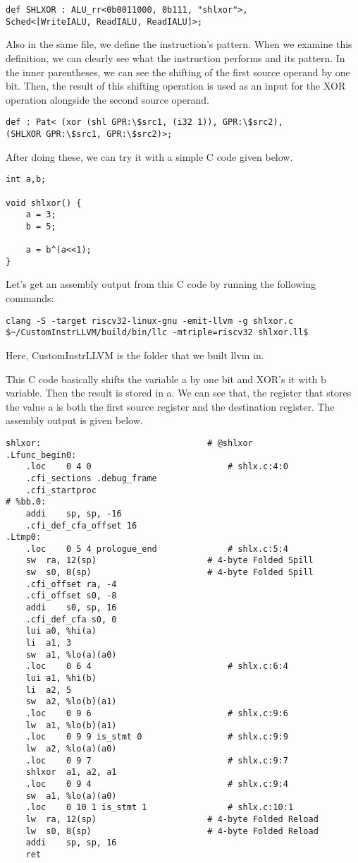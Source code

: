 \begin{lstlisting}
def SHLXOR : ALU_rr<0b0011000, 0b111, "shlxor">,
Sched<[WriteIALU, ReadIALU, ReadIALU]>;
\end{lstlisting}

Also in the same file, we define the instruction’s pattern. When we examine this definition, we can clearly see what the instruction performs and its pattern. In the inner parentheses, we can see the shifting of the first source operand by one bit. Then, the result of this shifting operation is used as an input for the XOR operation alongside the second source operand.

\begin{lstlisting}
def : Pat< (xor (shl GPR:\$src1, (i32 1)), GPR:\$src2),
(SHLXOR GPR:\$src1, GPR:\$src2)>;
\end{lstlisting}

After doing these, we can try it with a simple C code given below. 

\begin{lstlisting}
int a,b;

void shlxor() {
	a = 3;
	b = 5;
		
	a = b^(a<<1);
}
\end{lstlisting}

Let’s get an assembly output from this C code by running the following commands:

\begin{lstlisting}
clang -S -target riscv32-linux-gnu -emit-llvm -g shlxor.c
$~/CustomInstrLLVM/build/bin/llc -mtriple=riscv32 shlxor.ll$
\end{lstlisting}

Here, CustomInstrLLVM is the folder that we built llvm in.

This C code basically shifts the variable a by one bit and XOR’s it with b variable. Then the result is stored in a. We can see that, the register that stores the value a is both the first source register and the destination register. The assembly output is given below.

\begin{lstlisting}
shlxor:                                 # @shlxor
.Lfunc_begin0:
	.loc	0 4 0                           # shlx.c:4:0
	.cfi_sections .debug_frame
	.cfi_startproc
# %bb.0:
	addi	sp, sp, -16
	.cfi_def_cfa_offset 16
.Ltmp0:
	.loc	0 5 4 prologue_end              # shlx.c:5:4
	sw	ra, 12(sp)                      # 4-byte Folded Spill
	sw	s0, 8(sp)                       # 4-byte Folded Spill
	.cfi_offset ra, -4
	.cfi_offset s0, -8
	addi	s0, sp, 16
	.cfi_def_cfa s0, 0
	lui	a0, %hi(a)
	li	a1, 3
	sw	a1, %lo(a)(a0)
	.loc	0 6 4                           # shlx.c:6:4
	lui	a1, %hi(b)
	li	a2, 5
	sw	a2, %lo(b)(a1)
	.loc	0 9 6                           # shlx.c:9:6
	lw	a1, %lo(b)(a1)
	.loc	0 9 9 is_stmt 0                 # shlx.c:9:9
	lw	a2, %lo(a)(a0)
	.loc	0 9 7                           # shlx.c:9:7
	shlxor	a1, a2, a1
	.loc	0 9 4                           # shlx.c:9:4
	sw	a1, %lo(a)(a0)
	.loc	0 10 1 is_stmt 1                # shlx.c:10:1
	lw	ra, 12(sp)                      # 4-byte Folded Reload
	lw	s0, 8(sp)                       # 4-byte Folded Reload
	addi	sp, sp, 16
	ret
\end{lstlisting}


